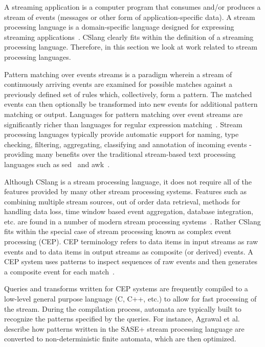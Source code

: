 A streaming application
is a computer program
that consumes and/or
produces
a stream of events (messages or other form of application-specific data).
A stream processing language is a domain-specific language
designed for expressing streaming applications~\cite{DBLP:journals/sigmod/HirzelBBVSV18}. CSlang clearly
fits within the definition of a streaming processing language.
Therefore, in this
section we look at work related to stream processing languages.

Pattern matching
over events streams is a paradigm
wherein a stream of continuously arriving events are examined for 
possible matches against a previously defined set of rules which, collectively, form a pattern.
The matched events can then optionally be transformed into new events for additional pattern matching or output.
Languages for pattern matching over event
streams are significantly richer than languages for regular expression
matching~\cite{DBLP:conf/sigmod/AgrawalDGI08}.
Stream processing languages typically provide automatic
support for naming, type checking, filtering, aggregating, classifying and
annotation of incoming events - providing many benefits over the traditional
stream-based text processing languages such as sed~\cite{Mcmahon1979sed} and
awk~\cite{DBLP:journals/spe/AhoKW79}.

Although CSlang is a stream processing language, it does not
require all of the features provided by many other stream processing systems. Features
such as combining multiple stream sources, out of order data retrieval, methods
for handling data loss, time window based event aggregation, database
integration, etc. are found in a number of modern stream processing
systems~\cite{DBLP:journals/csur/DayarathnaP18}. Rather CSlang fits within the special case of
stream processing known as complex event processing (CEP). CEP terminology refers
to data items in input streams as raw events and to data items in output streams
as composite (or derived) events. A CEP system uses patterns to inspect
sequences of raw events and then generates a composite event for each
match~\cite{DBLP:journals/ibmrd/HirzelAGJKKMNSSW13}.

Queries and transforms written for CEP systems are
frequently compiled to a low-level general purpose language (C, C++, etc.) to allow for fast
processing of the stream. During the compilation process, automata are typically
built to recognize the patterns specified by the queries. For instance, Agrawal et
al.~\cite{DBLP:conf/sigmod/AgrawalDGI08} describe how patterns written in the SASE+ stream
processing language are converted to non-deterministic finite automata, which are then
optimized.

